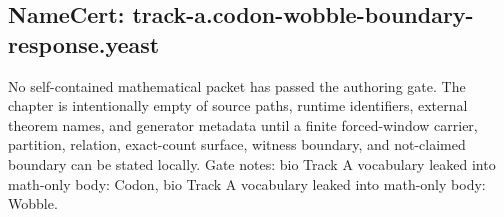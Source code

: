 \subsection{NameCert: track-a.codon-wobble-boundary-response.yeast}
\label{sec:namecert-track_a_codon_wobble_boundary_response_yeast}

No self-contained mathematical packet has passed the authoring gate. The chapter is intentionally empty of source paths, runtime identifiers, external theorem names, and generator metadata until a finite forced-window carrier, partition, relation, exact-count surface, witness boundary, and not-claimed boundary can be stated locally. Gate notes: bio Track A vocabulary leaked into math-only body: Codon, bio Track A vocabulary leaked into math-only body: Wobble.
